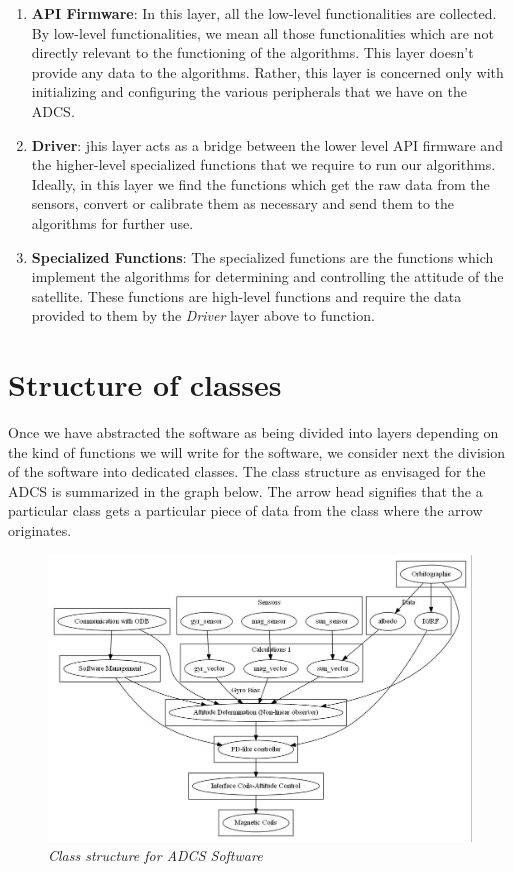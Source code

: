 \documentclass[11pt,a4paper]{report}
\begin{document}
\begin{enumerate}
\item 
\textbf{API Firmware}: In this layer, all the low-level functionalities are collected. By low-level functionalities, we mean all those functionalities which are not directly relevant to the functioning of the algorithms. This layer doesn't provide any data to the algorithms. Rather, this layer is concerned only with initializing and configuring the various peripherals that we have on the ADCS.
\item 
\textbf{Driver}: jhis layer acts as a bridge between the lower level API firmware and the higher-level specialized functions that we require to run our algorithms. Ideally, in this layer we find the functions which get the raw data from the sensors, convert or calibrate them as necessary and send them to the algorithms for further use.
\item 
\textbf{Specialized Functions}: The specialized functions are the functions which implement the algorithms for determining and controlling the attitude of the satellite. These functions are high-level functions and require the data provided to them by the \textit{Driver} layer above to function. 
\end{enumerate}

\section{Structure of classes} 
Once we have abstracted the software as being divided into layers depending on the kind of functions we will write for the software, we consider next the division of the software into dedicated classes. The class structure as envisaged for the ADCS is summarized in the graph below. The arrow head signifies that the a particular class gets a particular piece of data from the class where the arrow originates. 

\begin{figure}[h]
\centering 
\includegraphics[scale=0.6]{class_structure}
\caption{\textit{Class structure for ADCS Software}}
\label{struct_class}
\end{figure}
\end{document}
